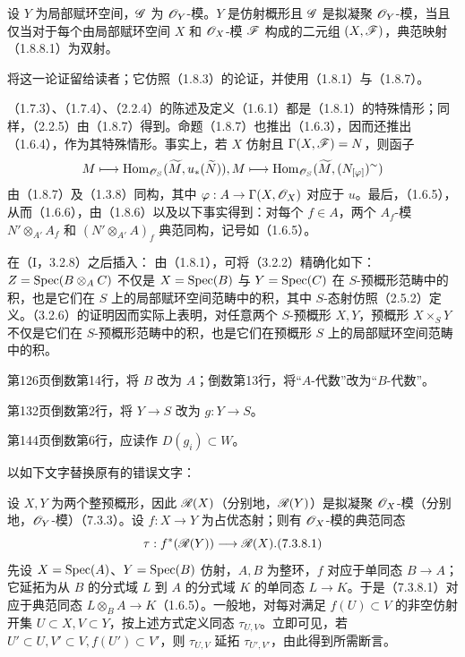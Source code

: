 设 $Y$ 为局部赋环空间，$\mathscr G$ 为 $\mathscr O_Y$-模。$Y$ 是仿射概形且 $\mathscr G$ 是拟凝聚 $\mathscr O_Y$-模，当且仅当对于每个由局部赋环空间 $X$ 和 $\mathscr O_X$-模 $\mathscr F$ 构成的二元组 $(X,\mathscr F)$，典范映射（1.8.8.1）为双射。

将这一论证留给读者；它仿照（1.8.3）的论证，并使用（1.8.1）与（1.8.7）。

（1.7.3）、（1.7.4）、（2.2.4）的陈述及定义（1.6.1）都是（1.8.1）的特殊情形；同样，（2.2.5）由（1.8.7）得到。命题（1.8.7）也推出（1.6.3），因而还推出（1.6.4），作为其特殊情形。事实上，若 $X$ 仿射且 $\Gamma(X,\mathscr F)=N$，则函子
\[
M\longmapsto\operatorname{Hom}_{\mathscr O_S}(\widetilde{M},u_*(\widetilde{N})),
M\longmapsto\operatorname{Hom}_{\mathscr O_S}(\widetilde{M},(N_{[\varphi]})^{\sim})
\]
由（1.8.7）及（1.3.8）同构，其中 $\varphi:A\to\Gamma(X,\mathscr O_X)$ 对应于 $u$。最后，（1.6.5），从而（1.6.6），由（1.8.6）以及以下事实得到：对每个 $f\in A$，两个 $A_f$-模
$N'\otimes_{A'}A_f$ 和 $(N'\otimes_{A'}A)_f$ 典范同构，记号如（1.6.5）。

\medskip\noindent 在（I，3.2.8）之后插入：
由（1.8.1），可将（3.2.2）精确化如下：$Z=\operatorname{Spec}(B\otimes_A C)$ 不仅是 $X=\operatorname{Spec}(B)$ 与 $Y=\operatorname{Spec}(C)$ 在 $S$-预概形范畴中的积，也是它们在 $S$ 上的局部赋环空间范畴中的积，其中 $S$-态射仿照（2.5.2）定义。（3.2.6）的证明因而实际上表明，对任意两个 $S$-预概形 $X,Y$，预概形 $X\times_S Y$ 不仅是它们在 $S$-预概形范畴中的积，也是它们在预概形 $S$ 上的局部赋环空间范畴中的积。

\begin{description}[style=nextline,leftmargin=2em]
\item[（I，4.4.5）] 第126页倒数第14行，将 $B$ 改为 $A$；倒数第13行，将“$A$-代数”改为“$B$-代数”。
\item[（I，5.3.5）] 第132页倒数第2行，将 $Y\to S$ 改为 $g:Y\to S$。
\item[（I，6.3.2.1）] 第144页倒数第6行，应读作 $D(g_i)\subset W$。
\item[（I，7.3.8）] 以如下文字替换原有的错误文字：
\end{description}
设 $X,Y$ 为两个整预概形，因此 $\mathscr R(X)$（分别地，$\mathscr R(Y)$）是拟凝聚 $\mathscr O_X$-模（分别地，$\mathscr O_Y$-模）（7.3.3）。设 $f:X\to Y$ 为占优态射；则有 $\mathscr O_X$-模的典范同态
\begin{equation}\tau:f^*(\R(Y))\longrightarrow\R(X).\tag{7.3.8.1}\end{equation}
先设 $X=\operatorname{Spec}(A)$、$Y=\operatorname{Spec}(B)$ 仿射，$A,B$ 为整环，$f$ 对应于单同态 $B\to A$；它延拓为从 $B$ 的分式域 $L$ 到 $A$ 的分式域 $K$ 的单同态 $L\to K$。于是（7.3.8.1）对应于典范同态 $L\otimes_B A\to K$（1.6.5）。一般地，对每对满足 $f(U)\subset V$ 的非空仿射开集 $U\subset X,V\subset Y$，按上述方式定义同态 $\tau_{U,V}$。立即可见，若 $U'\subset U,V'\subset V,f(U')\subset V'$，则 $\tau_{U,V}$ 延拓 $\tau_{U',V'}$，由此得到所需断言。

